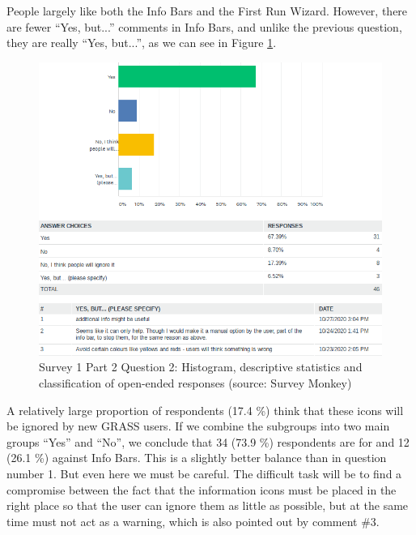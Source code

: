 \documentclass[a4paper,10pt,twoside]{article}
\begin{document}
\noindent People largely like both the Info Bars and the First Run Wizard. However, there are fewer ``Yes, but...'' comments in Info Bars, and unlike the previous question, they are really ``Yes, but...'', as we can see in Figure \ref{fig:survey1_part2_question2_all}. 

\vspace{0.3cm}
\begin{figure}[hbt!] 
\begin{center}
\includegraphics[width=15.5cm]{../surveys/analyzed_data/survey1_part2_question2_all.png} 
\caption[Survey 1 Part 2 Question 2: Histogram, descriptive statistics and classification of open-ended responses]{Survey 1 Part 2 Question 2: Histogram, descriptive statistics and classification of  open-ended responses (source:  Survey Monkey)}
\label{fig:survey1_part2_question2_all}
\end{center}
\end{figure}

\noindent A relatively large proportion of respondents (17.4 \%) think that these icons will be ignored by new GRASS users. If we combine the subgroups into two main groups ``Yes'' and ``No'', we conclude that 34 (73.9 \%) respondents are for and 12 (26.1 \%) against Info Bars. This is a slightly better balance than in question number 1. But even here we must be careful. The difficult task will be to find a compromise between the fact that the information icons must be placed in the right place so that the user can ignore them as little as possible, but at the same time must not act as a warning, which is also pointed out by comment \#3.
\end{document}
